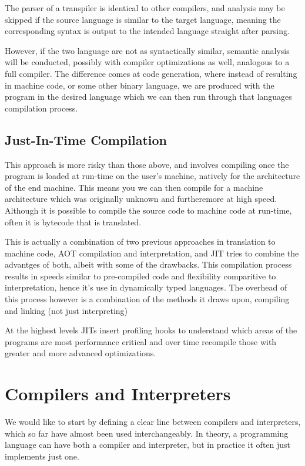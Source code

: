 {The parser of a transpiler is identical to other compilers, and analysis may be skipped if the source language is similar to the target language, meaning the corresponding syntax is output to the intended language straight after parsing. 

However, if the two language are not as syntactically similar, semantic analysis will be conducted, possibly with compiler optimizations as well, analogous to a full compiler. The difference comes at code generation, where instead of resulting in machine code, or some other binary language, we are produced with the program in the desired language which we can then run through that languages compilation process. 

\subsection{Just-In-Time Compilation}

This approach is more risky than those above, and involves compiling once the program is loaded at run-time on the user's machine, natively for the architecture of the end machine. This means you we can then compile for a machine architecture which was originally unknown and furtheremore at high speed. Although it is possible to compile the source code to machine code at run-time, often it is bytecode that is translated. 

This is actually a combination of two previous approaches in translation to machine code, \ac{AOT} compilation and interpretation, and \ac{JIT} tries to combine the advantges of both, albeit with some of the drawbacks. This compilation process results in speeds similar to pre-compiled code and flexibility comparitive to interpretation, hence it's use in dynamically typed languages. The overhead of this process however is a combination of the methods it draws upon, compiling and linking (not just interpreting)

At the highest levels \acsp{JIT} insert profiling hooks to understand which areas of the programs are most performance critical and over time recompile those with greater and more advanced optimizations. 

\section{Compilers and Interpreters}

We would like to start by defining a clear line between compilers and interpreters, which so far have almost been used interchangeably. In theory, a programming language can have both a compiler and interpreter, but in practice it often just implements just one. 

}
